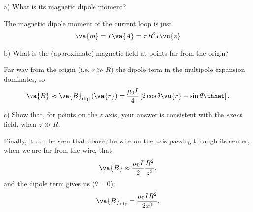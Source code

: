 \documentclass[12pt,a4paper]{article}
\begin{document}
a) What is its magnetic dipole moment? 

The magnetic dipole moment of the current loop is just 
\begin{align*}
    \va{m} = I \va{A} = \pi R^2 I \vu{z}
\end{align*}

b) What is the (approximate) magnetic field at points far from the origin?

Far way from the origin (i.e. $r \gg R$) the dipole term in the multipole expansion dominates, so
\begin{align*}
    \va{B} \approx \va{B}_{\rm dip}\left( \va{r} \right) = \frac{\mu_0 I}{4}\left[ 2 \cos{\theta} \vu{r} + \sin{\theta} \thhat \right]
.\end{align*}

c) Show that, for points on the $z$ axis, your answer is consistent with the \textit{exact} field, when $z \gg R$.

Finally, it can be seen that above the wire on the axis passing through its center, when we are far from the wire, that
\begin{align*}
    \va{B} \approx \frac{\mu_0 I}{2} \frac{R^2}{z^3}
,\end{align*}
and the dipole term gives us ($\theta = 0$):
\begin{align*}
\va{B}_{\rm dip} = \frac{\mu_0 I R^2}{2 z^3}
.\end{align*}
\end{document}

